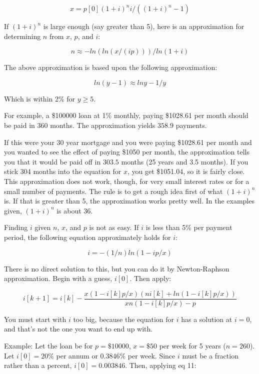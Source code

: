           \[ x = p[0]  (1 + i)^n  i / ( (1 + i)^n - 1)     \]


     If $(1 + i)^n$ is large enough (say greater than 5), here
     is an approximation for determining $n$ from $x$, $p$, and $i$:

          \[n \approx -ln( ln(x/(ip) ) ) / ln(1+i)               \]

     The above approximation is based upon the following approximation:

          \[ ln(y - 1)  \approx  ln y  -  1/y\]

    Which is within 2\% for $y \geq  5$.

     For example, a \$100000 loan at 1\% monthly, paying \$1028.61
     per month should be paid in $360$ months.  The approximation
     yields $358.9$ payments.

     If this were your 30 year mortgage and you were paying \$1028.61
     per month and you wanted to see the effect of paying \$1050
     per month, the approximation tells you that it would be paid
     off in $303.5$ months (25 years and 3.5 months).  If you stick
     304 months into the equation for $x$, you get \$1051.04, so
     it is fairly close.  This approximation does not work, though,
     for very small interest rates or for a small number of payments.
     The rule is to get a rough idea first of what $(1 + i)^n$ is.
     If that is greater than 5, the approximation works pretty
     well.  In the examples given, $(1 + i)^n$ is about 36.


     Finding $i$ given $n$, $x$, and $p$ is not as easy.  If $i$ is less than
     5\% per payment period, the following equation approximately
     holds for $i$:

      \[    i = -(1/n) ln(1 - ip/x)    \]

     There is no direct solution to this, but you can do it by
     Newton-Raphson approximation.  Begin with a guess, $i[0]$.
     Then apply:

\[i[k+1] = i[k] -\frac{x(1 - i[k]p/x)  (ni[k] + ln(1 - i[k]p/x))}
{xn(1 - i[k]p/x)  -  p}\]

     You must start with $i$ too big, because the equation for $i$ 
      has a solution
     at $i=0$, and that's not the one you want to end up with.

     Example:  Let the loan be for $p=\$10000$, $x=\$50$ per week for
     5 years ($n=260$).  Let $i[0] = 20$\% per annum or 0.3846\%
     per week.  Since $i$ must be a fraction rather than a percent,
     $i[0] = 0.003846$.  Then, applying eq 11:

